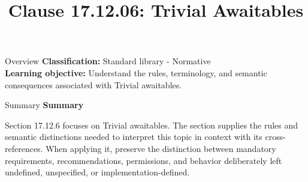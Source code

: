 \documentclass[10pt,letterpaper]{article}
\title{Clause 17.12.06: Trivial Awaitables}
\author{}
\date{}
\begin{document}
\maketitle
\begin{CornellOverviewBox}{Overview}
\textbf{Classification:} Standard library - Normative\\[2pt]
\textbf{Learning objective:} Understand the rules, terminology, and semantic consequences associated with Trivial awaitables.
\end{CornellOverviewBox}\begin{CornellSummaryBox}{Summary}
{\sffamily\bfseries\color{Accent} Summary}\par\vspace{3pt}Section 17.12.6 focuses on Trivial awaitables. The section supplies the rules and semantic distinctions needed to interpret this topic in context with its cross-references. When applying it, preserve the distinction between mandatory requirements, recommendations, permissions, and behavior deliberately left undefined, unspecified, or implementation-defined.
\end{CornellSummaryBox}
\end{document}
